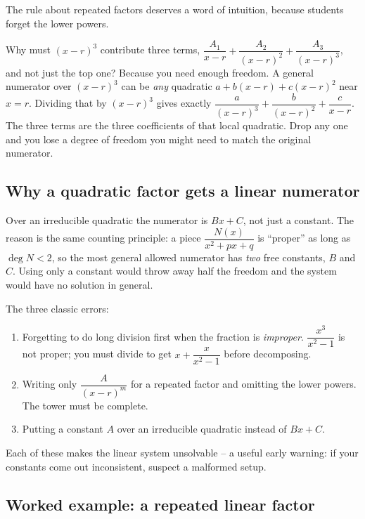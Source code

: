 The rule about repeated factors deserves a word of intuition, because students
forget the lower powers.

\begin{intuitionbox}
Why must $(x-r)^3$ contribute three terms, $\dfrac{A_1}{x-r} +
\dfrac{A_2}{(x-r)^2} + \dfrac{A_3}{(x-r)^3}$, and not just the top one? Because
you need enough freedom. A general numerator over $(x-r)^3$ can be \emph{any}
quadratic $a + b(x-r) + c(x-r)^2$ near $x=r$. Dividing that by $(x-r)^3$ gives
exactly $\dfrac{a}{(x-r)^3} + \dfrac{b}{(x-r)^2} + \dfrac{c}{x-r}$. The three
terms are the three coefficients of that local quadratic. Drop any one and you
lose a degree of freedom you might need to match the original numerator.
\end{intuitionbox}

\subsection{Why a quadratic factor gets a linear numerator}

Over an irreducible quadratic the numerator is $Bx + C$, not just a constant.
The reason is the same counting principle: a piece $\dfrac{N(x)}{x^2+px+q}$ is
``proper'' as long as $\deg N < 2$, so the most general allowed numerator has
\emph{two} free constants, $B$ and $C$. Using only a constant would throw away
half the freedom and the system would have no solution in general.

\begin{trapbox}
The three classic errors:
\begin{enumerate}
\item Forgetting to do long division first when the fraction is
   \emph{improper}. $\dfrac{x^3}{x^2-1}$ is not proper; you must divide to get
   $x + \dfrac{x}{x^2-1}$ before decomposing.
\item Writing only $\dfrac{A}{(x-r)^m}$ for a repeated factor and omitting the
   lower powers. The tower must be complete.
\item Putting a constant $A$ over an irreducible quadratic instead of $Bx+C$.
\end{enumerate}
Each of these makes the linear system unsolvable -- a useful early warning:
if your constants come out inconsistent, suspect a malformed setup.
\end{trapbox}

\subsection{Worked example: a repeated linear factor}

